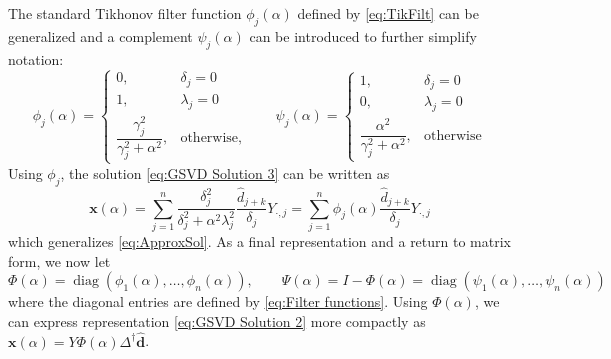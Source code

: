\documentclass[12pt]{article}
\newcommand{\dVec}{\mathbf{d}}	%
\newcommand{\xVec}{\mathbf{x}}	%
\newcommand{\pinv}[1]{{#1}^\dagger}	%
\DeclareMathOperator{\diag}{diag}	%
\newcommand{\regparam}{\alpha}  %
\newcommand{\filt}{\phi}
\newcommand{\mfilt}{\psi}
\newcommand{\svd}[1]{\widehat{#1}}	%
\begin{document}
The standard Tikhonov filter function $\filt_j(\regparam)$ defined by \eqref{eq:TikFilt} can be generalized and a complement $\mfilt_j(\regparam)$ can be introduced to further simplify notation:
\begin{equation}
\label{eq:Filter functions}
\filt_j(\regparam) = \begin{cases}
0, & \delta_j = 0 \\
1, & \lambda_j = 0 \\
\dfrac{\gamma^2_j}{\gamma^2_j + \regparam^2}, & \text{otherwise,}
\end{cases} \qquad
\mfilt_j(\regparam) = \begin{cases}
1, & \delta_j = 0 \\
0, & \lambda_j = 0 \\
\dfrac{\regparam^2}{\gamma^2_j + \regparam^2}, & \text{otherwise}
\end{cases}
\end{equation}
Using $\filt_j$, the solution \eqref{eq:GSVD Solution 3} can be written as
\begin{equation}
\label{eq:GSVD Solution 2}
\xVec(\regparam) = \sum_{j = 1}^{n} \frac{\delta^2_j}{\delta^2_j + \regparam^2 \lambda^2_j} \frac{\svd{d}_{j+k}}{\delta_j} Y_{\cdot,j} = \sum_{j = 1}^{n} \filt_j\left(\regparam\right) \frac{\svd{d}_{j+k}}{\delta_j} Y_{\cdot,j}
\end{equation} 
which generalizes \eqref{eq:ApproxSol}. As a final representation and a return to matrix form, we now let
\[\Phi(\regparam) = \diag\left(\filt_1(\regparam),\ldots,\filt_n(\regparam)\right), \qquad \Psi(\regparam) = I - \Phi(\regparam) = \diag\left(\mfilt_1(\regparam),\ldots,\mfilt_n(\regparam)\right)\]
where the diagonal entries are defined by \eqref{eq:Filter functions}. Using $\Phi(\regparam)$, we can express representation \eqref{eq:GSVD Solution 2} more compactly as $\xVec(\regparam) = Y\Phi(\regparam)\pinv{\Delta}\svd{\dVec}$.
\end{document}
